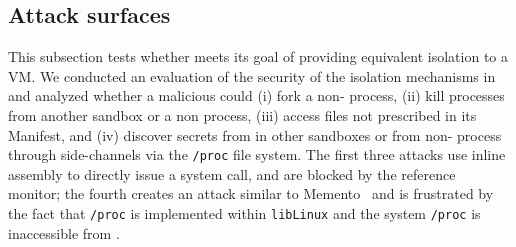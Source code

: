 


\subsection{Attack surfaces}



This subsection tests whether \graphene{} meets its goal of providing equivalent isolation
to a VM.
We conducted an evaluation of the security of the isolation mechanisms in \graphene{} and analyzed whether a malicious \graphene{} \picoproc{} could 
(i) fork a non-\graphene{} process, 
(ii)  kill processes from another sandbox or a non \graphene{} process, 
(iii) access files not prescribed in its Manifest, and 
(iv) discover secrets from \picoprocs{} in other sandboxes or from non-\graphene{} process through side-channels via the {\tt /proc} file system. 
The first three attacks use inline assembly to directly issue a system call, and are blocked by the reference monitor; the fourth creates
an attack similar to Memento~\cite{memento} and is frustrated by the fact that {\tt /proc} is implemented within {\tt libLinux} and
the system {\tt /proc} is inaccessible from \graphene{}.

